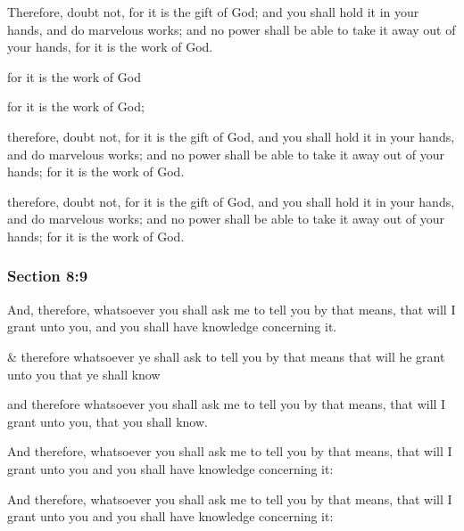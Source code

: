 		Therefore, doubt not, for it is the gift of God; and you shall hold it in your hands, and do marvelous works; and no power shall be able to take it away out of your hands, for it is the work of God.

		\begin{framed}
		\scriptsize
			\begin{compactdesc}
				\item[JSP] for it is the work of God
				\item[BC] for it is the work of God; 
				\item[DC 1835] therefore, doubt not, for it is the gift of God, and you shall hold it in your hands, and do marvelous works; and no power shall be able to take it away out of your hands; for it is the work of God. 
				\item[DC 1844] therefore, doubt not, for it is the gift of God, and you shall hold it in your hands, and do marvelous works; and no power shall be able to take it away out of your hands; for it is the work of God. 
			\end{compactdesc}
		\end{framed}

	\subsubsection{Section 8:9} %
		\label{DC8-9}

		And, therefore, whatsoever you shall ask me to tell you by that means, that will I grant unto you, and you shall have knowledge concerning it.

		\begin{framed}
		\scriptsize
			\begin{compactdesc}
				\item[JSP] \& therefore whatsoever ye shall ask to tell you by that means that will he grant unto you that ye shall know
				\item[BC] and therefore whatsoever you shall ask me to tell you by that means, that will I grant unto you, that you shall know.
				\item[DC 1835] And therefore, whatsoever you shall ask me to tell you by that means, that will I grant unto you and you shall have knowledge concerning it:
				\item[DC 1844] And therefore, whatsoever you shall ask me to tell you by that means, that will I grant unto you and you shall have knowledge concerning it: 
			\end{compactdesc}
		\end{framed}


